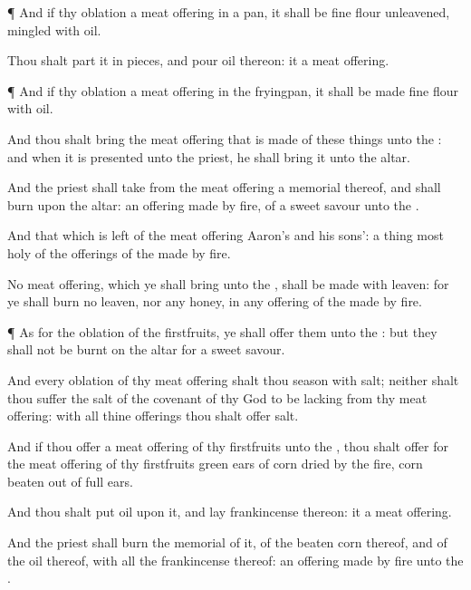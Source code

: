 {\par }{\PP {}¶ And if thy
oblation
{} a meat
offering
{} in a
pan, it shall be
{} fine
flour
unleavened,
mingled with
oil.

Thou shalt
part it in
pieces, and
pour
oil thereon: it
{} a meat
offering.


\par }{\PP {}¶ And if thy
oblation
{} a meat
offering
{} in the
fryingpan, it shall be
made
{} fine
flour with
oil.

And thou shalt
bring the meat
offering that is
made of these things unto the
{}: and when it is
presented unto the
priest, he shall
bring it unto the
altar.

And the
priest shall
take from the meat
offering a
memorial thereof, and shall
burn
{} upon the
altar:
{} an offering made by
fire, of a
sweet
savour unto the
{}.

And that which is
left of the meat
offering
{}
Aaron’s and his
sons’:
{} a thing
most
holy of the
offerings of the
{} made by
fire.


\par }{\PP {}No meat
offering, which ye shall
bring unto the
{}, shall be
made with
leaven: for ye shall
burn no
leaven, nor any
honey, in any
offering of the
{} made by
fire.


\par }{\PP {}¶ As for the
oblation of the
firstfruits, ye shall
offer them unto the
{}: but they shall not be
burnt on the
altar for a
sweet
savour.

And every
oblation of thy meat
offering shalt thou
season with
salt; neither shalt thou suffer the
salt of the
covenant of thy
God to be
lacking from thy meat
offering: with all thine
offerings thou shalt
offer
salt.

And if thou
offer a meat
offering of thy
firstfruits unto the
{}, thou shalt
offer for the meat
offering of thy
firstfruits green
ears of corn
dried by the
fire,
{} corn
beaten out of full
ears.

And thou shalt
put
oil upon it, and
lay
frankincense thereon: it
{} a meat
offering.

And the
priest shall
burn the
memorial of it,
{} of the beaten
corn thereof, and
{} of the
oil thereof, with all the
frankincense thereof:
{} an offering made by
fire unto the
{}.




}
